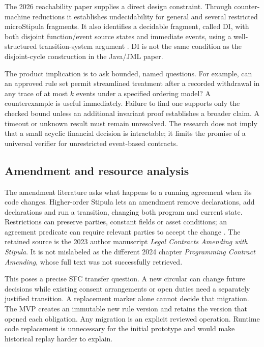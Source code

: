 \documentclass[12pt,a4paper,oneside,openany]{book}
\begin{document}
The 2026 reachability paper supplies a direct design constraint. Through
counter-machine reductions it establishes undecidability for general and several
restricted microStipula fragments. It also identifies a decidable fragment,
called DI, with both disjoint function/event source states and immediate events,
using a well-structured transition-system argument
\citep[secs.~2--4]{reachability2026}. DI is not the same condition as the
disjoint-cycle construction in the Java/JML paper.

The product implication is to ask bounded, named questions. For example, can an
approved rule set permit streamlined treatment after a recorded withdrawal in
any trace of at most $k$ events under a specified ordering model? A counterexample
is useful immediately. Failure to find one supports only the checked bound unless
an additional invariant proof establishes a broader claim. A timeout or unknown
result must remain unresolved. The research does not imply that a small acyclic
financial decision is intractable; it limits the promise of a universal verifier
for unrestricted event-based contracts.

\subsection{Amendment and resource analysis}
\label{merge:P-02b-contract-evolution:00}


The amendment literature asks what happens to a running agreement when its code
changes. Higher-order Stipula lets an amendment remove declarations, add
declarations and run a transition, changing both program and current state.
Restrictions can preserve parties, constant fields or asset conditions; an
agreement predicate can require relevant parties to accept the change
\citep[secs.~4--6]{amending2023}. The retained source is the 2023 author manuscript
\emph{Legal Contracts Amending with Stipula}. It is not mislabeled as the different
2024 chapter \emph{Programming Contract Amending}, whose full text was not
successfully retrieved.

This poses a precise SFC transfer question. A new circular can change future
decisions while existing consent arrangements or open duties need a separately
justified transition. A replacement marker alone cannot decide that migration.
The MVP creates an immutable new rule version and retains the version that
opened each obligation. Any migration is an explicit reviewed operation.
Runtime code replacement is unnecessary for the initial prototype and would make
historical replay harder to explain.
\end{document}
